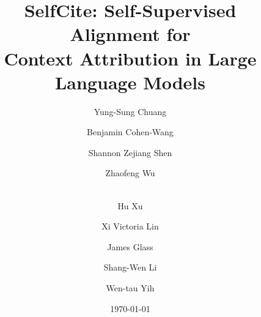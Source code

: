 \documentclass[]{fairmeta}
\title{SelfCite: Self-Supervised Alignment for \\ 
Context Attribution in Large Language Models}
\author[2]{Yung-Sung Chuang}
\author[2]{Benjamin Cohen-Wang}
\author[2]{Shannon Zejiang Shen}
\author[2]{Zhaofeng Wu}
\author[1]{\\Hu Xu}
\author[1]{Xi Victoria Lin}
\author[2]{James Glass}
\author[1]{Shang-Wen Li}
\author[1]{Wen-tau Yih}
\affiliation[1]{Meta FAIR}
\affiliation[2]{Massachusetts Institute of Technology}
\date{\today}
\begin{document}
\maketitle










\clearpage
\newpage
\beginappendix


\end{document}
